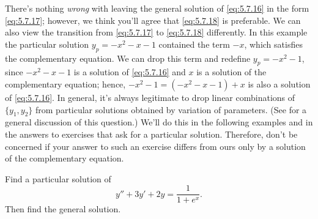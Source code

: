 There's nothing \emph{\color{blue}wrong} with leaving the general solution of
\eqref{eq:5.7.16} in the form \eqref{eq:5.7.17};     however, we think
you'll agree that \eqref{eq:5.7.18} is preferable. We can also view the
transition from \eqref{eq:5.7.17} to \eqref{eq:5.7.18} differently. In
this example the particular solution $y_p=-x^2-x-1$ contained the term
$-x$, which satisfies the complementary equation. We can
 drop this term and redefine $y_p=-x^2-1$, since
 $-x^2-x-1$ is a solution of \eqref{eq:5.7.16} and $x$ is a solution
of the complementary equation; hence, $-x^2-1=(-x^2-x-1)+x$
is also a solution of \eqref{eq:5.7.16}. In general, it's always
legitimate to drop linear combinations of $\{y_1,y_2\}$ from
particular solutions obtained by variation of parameters. (See
 for a general discussion of this question.)
We'll do this in the following  examples and in the answers to
exercises that ask  for a particular solution. Therefore, don't be
concerned if your answer to such an exercise differs from ours only by
a solution of the complementary equation.

\begin{example}\label{example:5.7.3}
 Find a particular solution of
\begin{equation}  \label{eq:5.7.19}
y''+3y'+2y=\frac{1}{1+e^x}.
\end{equation}
Then find the general solution.
\end{example}

